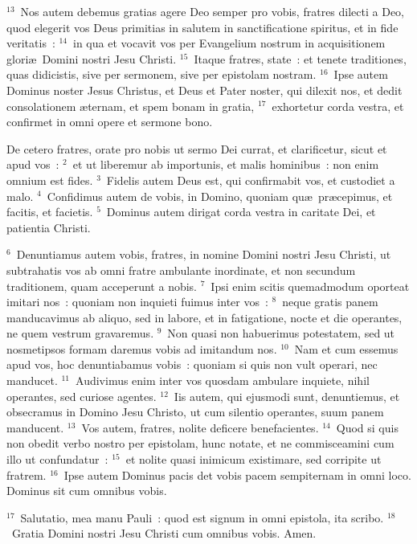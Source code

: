 ${}^{13}$~Nos autem debemus gratias agere Deo semper pro vobis, fratres dilecti a Deo, quod elegerit vos Deus primitias in salutem in sanctificatione spiritus, et in fide veritatis~:
${}^{14}$~in qua et vocavit vos per Evangelium nostrum in acquisitionem glori\ae\ Domini nostri Jesu Christi.
${}^{15}$~Itaque fratres, state~: et tenete traditiones, quas didicistis, sive per sermonem, sive per epistolam nostram.
${}^{16}$~Ipse autem Dominus noster Jesus Christus, et Deus et Pater noster, qui dilexit nos, et dedit consolationem \ae ternam, et spem bonam in gratia,
${}^{17}$~exhortetur corda vestra, et confirmet in omni opere et sermone bono.

\lettrine[lines=10,image=true,loversize=0.05,lraise=-0.03]{D}{}e cetero fratres, orate pro nobis ut sermo Dei currat, et clarificetur, sicut et apud vos~:
${}^{2}$~et ut liberemur ab importunis, et malis hominibus~: non enim omnium est fides.
${}^{3}$~Fidelis autem Deus est, qui confirmabit vos, et custodiet a malo.
${}^{4}$~Confidimus autem de vobis, in Domino, quoniam qu\ae\ pr\ae cepimus, et facitis, et facietis.
${}^{5}$~Dominus autem dirigat corda vestra in caritate Dei, et patientia Christi.


${}^{6}$~Denuntiamus autem vobis, fratres, in nomine Domini nostri Jesu Christi, ut subtrahatis vos ab omni fratre ambulante inordinate, et non secundum traditionem, quam acceperunt a nobis.
${}^{7}$~Ipsi enim scitis quemadmodum oporteat imitari nos~: quoniam non inquieti fuimus inter vos~:
${}^{8}$~neque gratis panem manducavimus ab aliquo, sed in labore, et in fatigatione, nocte et die operantes, ne quem vestrum gravaremus.
${}^{9}$~Non quasi non habuerimus potestatem, sed ut nosmetipsos formam daremus vobis ad imitandum nos.
${}^{10}$~Nam et cum essemus apud vos, hoc denuntiabamus vobis~: quoniam si quis non vult operari, nec manducet.
${}^{11}$~Audivimus enim inter vos quosdam ambulare inquiete, nihil operantes, sed curiose agentes.
${}^{12}$~Iis autem, qui ejusmodi sunt, denuntiemus, et obsecramus in Domino Jesu Christo, ut cum silentio operantes, suum panem manducent.
${}^{13}$~Vos autem, fratres, nolite deficere benefacientes.
${}^{14}$~Quod si quis non obedit verbo nostro per epistolam, hunc notate, et ne commisceamini cum illo ut confundatur~:
${}^{15}$~et nolite quasi inimicum existimare, sed corripite ut fratrem.
${}^{16}$~Ipse autem Dominus pacis det vobis pacem sempiternam in omni loco. Dominus sit cum omnibus vobis.


${}^{17}$~Salutatio, mea manu Pauli~: quod est signum in omni epistola, ita scribo.
${}^{18}$~Gratia Domini nostri Jesu Christi cum omnibus vobis. Amen.
